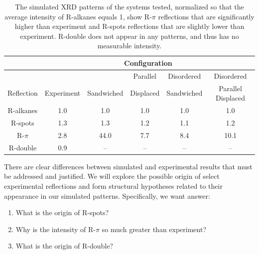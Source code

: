 \documentclass[journal=jpcbfk,manuscript=article]{achemso}
\begin{document}
  \begin{table}[h]
  \centering
  \begin{tabular}{c|ccccc}
  \toprule
 		   & \multicolumn{5}{c}{Configuration} \\
  \hline
             &            &            & Parallel  & Disordered & Disordered         \\
  Reflection & Experiment & Sandwiched & Displaced & Sandwiched & Parallel Displaced \\
  \midrule
  R-alkanes  & 1.0        &  1.0       &  1.0      & 1.0        & 1.0                \\  
  R-spots    & 1.3        &  1.3       &  1.2      & 1.1        & 1.2                \\
  R-$\pi$    & 2.8        & 44.0       &  7.7      & 8.4        & 10.1               \\
  R-double   & 0.9        &  --        & --        &  --        & --                 \\ 
  \bottomrule
  \end{tabular}
  \caption{The simulated XRD patterns of the systems tested, normalized so that the average 
  intensity of R-alkanes equals 1, show R-$\pi$ reflections that are significantly higher 
  than experiment and R-spots reflections that are slightly lower than experiment. R-double
  does not appear in any patterns, and thus has no measurable intensity.}
  \label{table:relative_inensities_300K} 
  \end{table}
  There are clear differences between simulated and experimental results that must be addressed
  and justified. We will explore the possible origin of select experimental reflections and form 
  structural hypotheses related to their appearance in our simulated patterns. Specifically, we 
  want answer:  
  \begin{enumerate}
	\item What is the origin of R-spots?
  	\item Why is the intensity of R-$\pi$ so much greater than experiment?
  	\item What is the origin of R-double?
  \end{enumerate}
  
\end{document}
